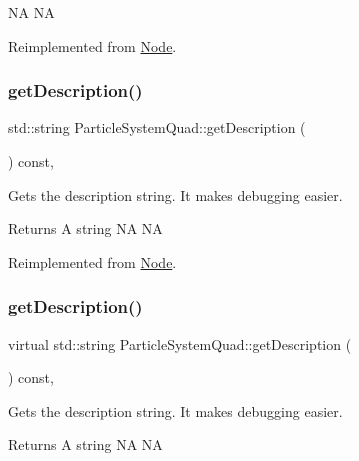 NA  NA 

Reimplemented from \hyperlink{classNode_abcf85087a15901deb7c6c1231634c8ab}{Node}.

\mbox{\label{classParticleSystemQuad_a33c853c9e7bd5763c7775b1944ec9572}} 
\subsubsection{\texorpdfstring{get\+Description()}{getDescription()}\hspace{0.1cm}{\footnotesize\ttfamily [1/2]}}
{\footnotesize\ttfamily std\+::string Particle\+System\+Quad\+::get\+Description (\begin{DoxyParamCaption}{ }\end{DoxyParamCaption}) const\hspace{0.3cm}{\ttfamily [override]}, {\ttfamily [virtual]}}

Gets the description string. It makes debugging easier. \begin{DoxyReturn}{Returns}
A string  NA  NA 
\end{DoxyReturn}


Reimplemented from \hyperlink{classNode_a41710375a0d92a4ee54c39fe123b5912}{Node}.

\mbox{\label{classParticleSystemQuad_a35f7879ed4a7c15a151b83d49f7c2502}} 
\subsubsection{\texorpdfstring{get\+Description()}{getDescription()}\hspace{0.1cm}{\footnotesize\ttfamily [2/2]}}
{\footnotesize\ttfamily virtual std\+::string Particle\+System\+Quad\+::get\+Description (\begin{DoxyParamCaption}{ }\end{DoxyParamCaption}) const\hspace{0.3cm}{\ttfamily [override]}, {\ttfamily [virtual]}}

Gets the description string. It makes debugging easier. \begin{DoxyReturn}{Returns}
A string  NA  NA 
\end{DoxyReturn}


